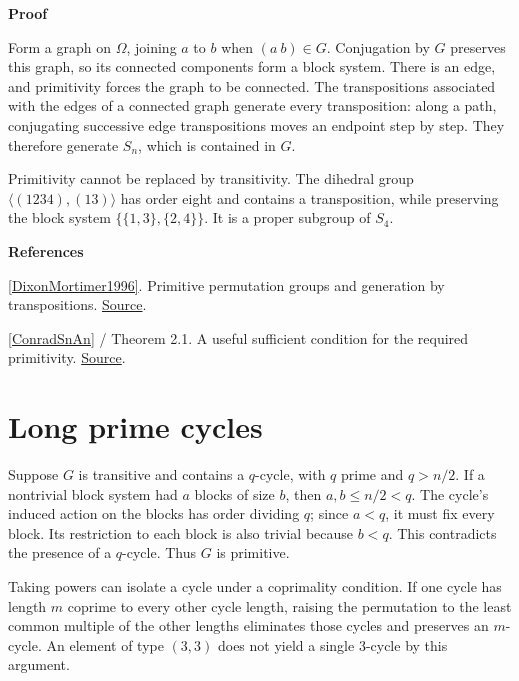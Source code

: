 \documentclass[11pt,a4paper,oneside,openany]{book}
\newenvironment{sources}{\par\smallskip\begingroup\footnotesize\color{atlasgray}\leftskip=10pt\setlength{\parskip}{2pt}}{\par\endgroup\smallskip}
\begin{document}
\begin{atlasblock}[standard]
\textbf{\sffamily Proof}\par\smallskip
\color{black} Form a graph on \(\Omega\), joining \(a\) to \(b\) when \((a\ b)\in G\). Conjugation by \(G\) preserves this graph, so its connected components form a block system. There is an edge, and primitivity forces the graph to be connected. The transpositions associated with the edges of a connected graph generate every transposition: along a path, conjugating successive edge transpositions moves an endpoint step by step. They therefore generate \(S_n\), which is contained in \(G\).\par
\end{atlasblock}\color{black}
\color{black} Primitivity cannot be replaced by transitivity. The dihedral group \(\langle(1234),(13)\rangle\) has order eight and contains a transposition, while preserving the block system \(\{\{1,3\},\{2,4\}\}\). It is a proper subgroup of \(S_4\).\par
\begin{sources}
\textbf{References}\par\smallskip
\noindent\hyperlink{ref:DixonMortimer1996}{[DixonMortimer1996]}. Primitive permutation groups and generation by transpositions. \href{https://link.springer.com/book/10.1007/978-1-4612-0731-3}{Source}.\par
\noindent\hyperlink{ref:ConradSnAn}{[ConradSnAn]} / Theorem 2.1. A useful sufficient condition for the required primitivity. \href{https://kconrad.math.uconn.edu/blurbs/galoistheory/galoisSnAn.pdf}{Source}.\par
\end{sources}\color{black}
\section{Long prime cycles}
\color{black} Suppose \(G\) is transitive and contains a \(q\)-cycle, with \(q\) prime and \(q>n/2\). If a nontrivial block system had \(a\) blocks of size \(b\), then \(a,b\le n/2<q\). The cycle's induced action on the blocks has order dividing \(q\); since \(a<q\), it must fix every block. Its restriction to each block is also trivial because \(b<q\). This contradicts the presence of a \(q\)-cycle. Thus \(G\) is primitive.\par
\color{black} Taking powers can isolate a cycle under a coprimality condition. If one cycle has length \(m\) coprime to every other cycle length, raising the permutation to the least common multiple of the other lengths eliminates those cycles and preserves an \(m\)-cycle. An element of type \((3,3)\) does not yield a single 3-cycle by this argument.\par
\end{document}
